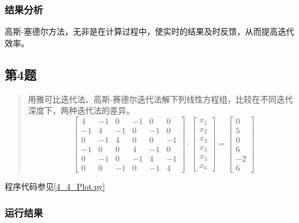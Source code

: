 \subsubsection{结果分析}
高斯-塞德尔方法，无非是在计算过程中，使实时的结果及时反馈，从而提高迭代效率。


\subsection{第4题}
\begin{quote}
    {\kaishu
        用雅可比迭代法、高斯-赛德尔迭代法解下列线性方程组，比较在不同迭代深度下，两种迭代法的差异。
        \begin{equation}
            \left[ \begin{array}{rrrrrr}{4} & {-1} & {0} & {-1} & {0} & {0} \\ {-1} & {4} & {-1} & {0} & {-1} & {0} \\ {0} & {-1} & {4} & {0} & {0} & {-1} \\ {-1} & {0} & {0} & {4} & {-1} & {0} \\ {0} & {-1} & {0} & {-1} & {4} & {-1} \\ {0} & {0} & {-1} & {0} & {-1} & {4}\end{array}\right] \cdot \left[ \begin{array}{c}{x_{1}} \\ {x_{2}} \\ {x_{3}} \\ {x_{3}} \\ {x_{5}} \\ {x_{6}}\end{array}\right]=\left[ \begin{array}{r}{0} \\ {5} \\ {0} \\ {6} \\ {-2} \\ {6}\end{array}\right]
        \end{equation}
    }
\end{quote}

程序代码参见\ref{4_4_Plot.py}

\subsubsection{运行结果}

